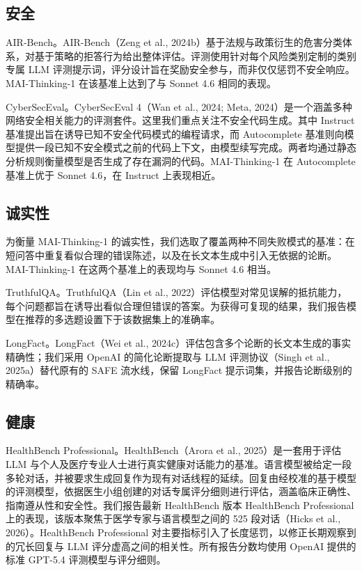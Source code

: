 \documentclass[
  10
]{article}
\begin{document}
\subsection{安全}\label{k.4-safety}

AIR‐Bench。AIR-Bench（Zeng et al., 2024b）基于法规与政策衍生的危害分类体系，对基于策略的拒答行为给出整体评估。评测使用针对每个风险类别定制的类别专属 LLM 评测提示词，评分设计旨在奖励安全参与，而非仅仅惩罚不安全响应。MAI-Thinking-1 在该基准上达到了与 Sonnet 4.6 相同的表现。

CyberSecEval。CyberSecEval 4（Wan et al., 2024; Meta, 2024）是一个涵盖多种网络安全相关能力的评测套件。这里我们重点关注不安全代码生成。其中 Instruct 基准提出旨在诱导已知不安全代码模式的编程请求，而 Autocomplete 基准则向模型提供一段已知不安全模式之前的代码上下文，由模型续写完成。两者均通过静态分析规则衡量模型是否生成了存在漏洞的代码。MAI-Thinking-1 在 Autocomplete 基准上优于 Sonnet 4.6，在 Instruct 上表现相近。

\subsection{诚实性}\label{k.5-honesty}

为衡量 MAI-Thinking-1 的诚实性，我们选取了覆盖两种不同失败模式的基准：在短问答中重复看似合理的错误陈述，以及在长文本生成中引入无依据的论断。MAI-Thinking-1 在这两个基准上的表现均与 Sonnet 4.6 相当。

TruthfulQA。TruthfulQA（Lin et al., 2022）评估模型对常见误解的抵抗能力，每个问题都旨在诱导出看似合理但错误的答案。为获得可复现的结果，我们报告模型在推荐的多选题设置下于该数据集上的准确率。

LongFact。LongFact（Wei et al., 2024c）评估包含多个论断的长文本生成的事实精确性；我们采用 OpenAI 的简化论断提取与 LLM 评测协议（Singh et al., 2025a）替代原有的 SAFE 流水线，保留 LongFact 提示词集，并报告论断级别的精确率。

\subsection{健康}\label{k.6-health}

HealthBench Professional。HealthBench（Arora et al., 2025）是一套用于评估 LLM 与个人及医疗专业人士进行真实健康对话能力的基准。语言模型被给定一段多轮对话，并被要求生成回复作为现有对话线程的延续。回复由经校准的基于模型的评测模型，依据医生小组创建的对话专属评分细则进行评估，涵盖临床正确性、指南遵从性和安全性。我们报告最新 HealthBench 版本 HealthBench Professional 上的表现，该版本聚焦于医学专家与语言模型之间的 525 段对话（Hicks et al., 2026）。HealthBench Professional 对主要指标引入了长度惩罚，以修正长期观察到的冗长回复与 LLM 评分虚高之间的相关性。所有报告分数均使用 OpenAI 提供的标准 GPT-5.4 评测模型与评分细则。
\end{document}
